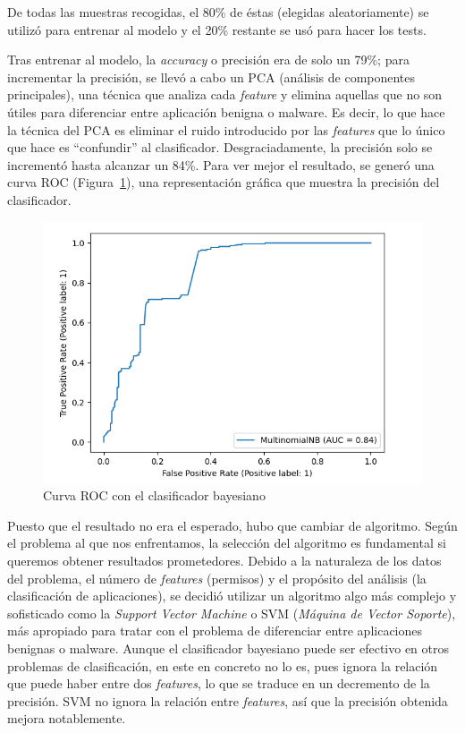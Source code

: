 De todas las muestras recogidas, el 80\% de éstas (elegidas aleatoriamente) se utilizó para entrenar al modelo y el 20\% restante se usó para hacer los tests.

Tras entrenar al modelo, la \textit{accuracy} o precisión era de solo un 79\%; para incrementar la precisión, se llevó a cabo un PCA (análisis de componentes principales), una técnica que analiza cada \textit{feature} y elimina aquellas que no son útiles para diferenciar entre aplicación benigna o malware. Es decir, lo que hace la técnica del PCA es eliminar el ruido introducido por las \textit{features} que lo único que hace es ``confundir'' al clasificador. Desgraciadamente, la precisión solo se incrementó hasta alcanzar un 84\%. Para ver mejor el resultado, se generó una curva ROC (Figura~\ref{fig:roc1}), una representación gráfica que muestra la precisión del clasificador.

\begin{figure}[H]
\centering
	\includegraphics[scale=0.6]{img/roc-84.png}
	\caption{Curva ROC con el clasificador bayesiano}
	\label{fig:roc1}
\end{figure}

Puesto que el resultado no era el esperado, hubo que cambiar de algoritmo. Según el problema al que nos enfrentamos, la selección del algoritmo es fundamental si queremos obtener resultados prometedores\hypersetup{citecolor=red}\cite{oreilly}. Debido a la naturaleza de los datos del problema, el número de \textit{features} (permisos) y el propósito del análisis (la clasificación de aplicaciones), se decidió utilizar un algoritmo algo más complejo y sofisticado como la \textit{Support Vector Machine} o SVM (\textit{Máquina de Vector Soporte}), más apropiado para tratar con el problema de diferenciar entre aplicaciones benignas o malware. Aunque el clasificador bayesiano puede ser efectivo en otros problemas de clasificación, en este en concreto no lo es, pues ignora la relación que puede haber entre dos \textit{features}, lo que se traduce en un decremento de la precisión. SVM no ignora la relación entre \textit{features}, así que la precisión obtenida mejora notablemente.

